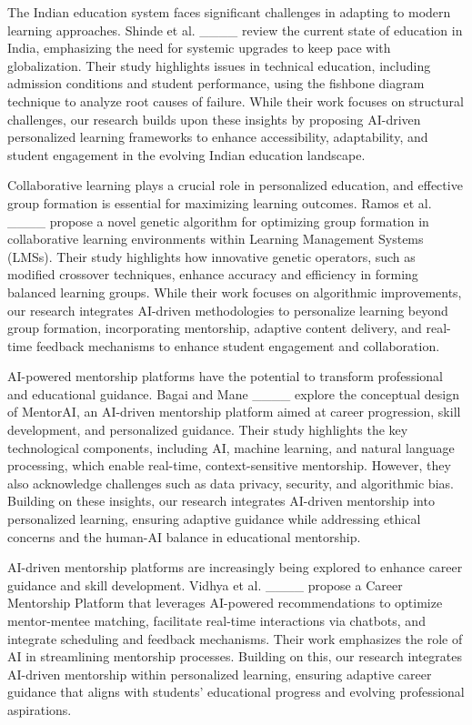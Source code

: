 The Indian education system faces significant challenges in adapting to modern learning approaches. Shinde et al. ____ review the current state of education in India, emphasizing the need for systemic upgrades to keep pace with globalization. Their study highlights issues in technical education, including admission conditions and student performance, using the fishbone diagram technique to analyze root causes of failure. While their work focuses on structural challenges, our research builds upon these insights by proposing AI-driven personalized learning frameworks to enhance accessibility, adaptability, and student engagement in the evolving Indian education landscape.


Collaborative learning plays a crucial role in personalized education, and effective group formation is essential for maximizing learning outcomes. Ramos et al. ____ propose a novel genetic algorithm for optimizing group formation in collaborative learning environments within Learning Management Systems (LMSs). Their study highlights how innovative genetic operators, such as modified crossover techniques, enhance accuracy and efficiency in forming balanced learning groups. While their work focuses on algorithmic improvements, our research integrates AI-driven methodologies to personalize learning beyond group formation, incorporating mentorship, adaptive content delivery, and real-time feedback mechanisms to enhance student engagement and collaboration.


AI-powered mentorship platforms have the potential to transform professional and educational guidance. Bagai and Mane ____ explore the conceptual design of MentorAI, an AI-driven mentorship platform aimed at career progression, skill development, and personalized guidance. Their study highlights the key technological components, including AI, machine learning, and natural language processing, which enable real-time, context-sensitive mentorship. However, they also acknowledge challenges such as data privacy, security, and algorithmic bias. Building on these insights, our research integrates AI-driven mentorship into personalized learning, ensuring adaptive guidance while addressing ethical concerns and the human-AI balance in educational mentorship.

AI-driven mentorship platforms are increasingly being explored to enhance career guidance and skill development. Vidhya et al. ____ propose a Career Mentorship Platform that leverages AI-powered recommendations to optimize mentor-mentee matching, facilitate real-time interactions via chatbots, and integrate scheduling and feedback mechanisms. Their work emphasizes the role of AI in streamlining mentorship processes. Building on this, our research integrates AI-driven mentorship within personalized learning, ensuring adaptive career guidance that aligns with students’ educational progress and evolving professional aspirations.

